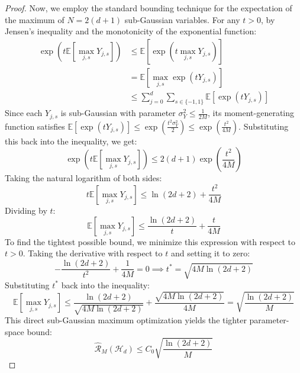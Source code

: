 \documentclass{article}
\theoremstyle{plain}
\theoremstyle{definition}
\theoremstyle{remark}
\begin{document}
\begin{proof}
Now, we employ the standard bounding technique for the expectation of the maximum of $N = 2(d+1)$ sub-Gaussian variables. For any $t > 0$, by Jensen's inequality and the monotonicity of the exponential function:
\begin{align}
\exp\left( t \mathbb{E} \left[ \max_{j, s} Y_{j, s} \right] \right) &\le \mathbb{E} \left[ \exp\left( t \max_{j, s} Y_{j, s} \right) \right] \\
&= \mathbb{E} \left[ \max_{j, s} \exp\left( t Y_{j, s} \right) \right] \\
&\le \sum_{j=0}^d \sum_{s \in \{-1, 1\}} \mathbb{E} \left[ \exp\left( t Y_{j, s} \right) \right]
\end{align}
Since each $Y_{j, s}$ is sub-Gaussian with parameter $\sigma_Y^2 \le \frac{1}{2M}$, its moment-generating function satisfies $\mathbb{E} [\exp(t Y_{j, s})] \le \exp\left( \frac{t^2 \sigma_Y^2}{2} \right) \le \exp\left( \frac{t^2}{4 M} \right)$. Substituting this back into the inequality, we get:
\begin{equation}
\exp\left( t \mathbb{E} \left[ \max_{j, s} Y_{j, s} \right] \right) \le 2(d+1) \exp\left( \frac{t^2}{4 M} \right)
\end{equation}
Taking the natural logarithm of both sides:
\begin{equation}
t \mathbb{E} \left[ \max_{j, s} Y_{j, s} \right] \le \ln(2 d + 2) + \frac{t^2}{4 M}
\end{equation}
Dividing by $t$:
\begin{equation}
\mathbb{E} \left[ \max_{j, s} Y_{j, s} \right] \le \frac{\ln(2 d + 2)}{t} + \frac{t}{4 M}
\end{equation}
To find the tightest possible bound, we minimize this expression with respect to $t > 0$. Taking the derivative with respect to $t$ and setting it to zero:
\begin{equation}
-\frac{\ln(2 d + 2)}{t^2} + \frac{1}{4 M} = 0 \implies t^* = \sqrt{4 M \ln(2 d + 2)}
\end{equation}
Substituting $t^*$ back into the inequality:
\begin{equation}
\mathbb{E} \left[ \max_{j, s} Y_{j, s} \right] \le \frac{\ln(2 d + 2)}{\sqrt{4 M \ln(2 d + 2)}} + \frac{\sqrt{4 M \ln(2 d + 2)}}{4 M} = \sqrt{\frac{\ln(2 d + 2)}{M}}
\end{equation}
This direct sub-Gaussian maximum optimization yields the tighter parameter-space bound:
\begin{equation}
\label{eq:tighter_direct_bound}
\widehat{\mathcal{R}}_M(\mathcal{H}_d) \le C_0 \sqrt{\frac{\ln(2 d + 2)}{M}}
\end{equation}


\end{proof}
\end{document}
